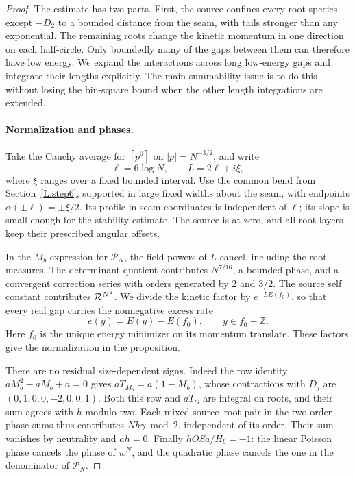 \begin{proof}
The estimate has two parts. First, the source confines every root species
except \(-D_2\) to a bounded distance from the seam, with tails stronger
than any exponential. The remaining roots change the kinetic momentum
in one direction on each half-circle. Only boundedly many of the gaps
between them can therefore have low energy. We expand the interactions
across long low-energy gaps and integrate their lengths explicitly. The
main summability issue is to do this without losing the bin-square bound
when the other length integrations are extended.

\paragraph{Normalization and phases.}
Take the Cauchy average for \([p^0]\) on \(|p|=N^{-3/2}\), and write
\[
 \ell=6\log N,\qquad L=2\ell+i\xi,
\]
where \(\xi\) ranges over a fixed bounded interval. Use the common bend
from Section~\ref{L:step6}, supported in large fixed widths about the
seam, with endpoints \(\alpha(\pm\ell)=\pm\xi/2\). Its profile in seam
coordinates is independent of \(\ell\); its slope is small enough for
the stability estimate. The source is at zero, and all root layers keep
their prescribed angular offsets.

In the \(M_b\) expression for \(\mathscr P_N\), the field powers of
\(L\) cancel, including the root measures. The determinant quotient
contributes \(N^{7/16}\), a bounded phase, and a convergent correction
series with orders generated by \(2\) and \(3/2\). The source self
constant contributes \({\cal R}^{N^2}\). We divide the kinetic factor
by \(e^{-L E(f_0)}\), so that every real gap carries the nonnegative
excess rate
\[
 e(y)=E(y)-E(f_0),\qquad y\in f_0+\mathbb Z.
\]
Here \(f_0\) is the unique energy minimizer on its momentum translate.
These factors give the normalization in the proposition.

There are no residual size-dependent signs. Indeed the row identity
\(aM_b^2-aM_b+a=0\) gives
\(aT_{M_b}=a(1-M_b)\), whose contractions with \(D_j\) are
\((0,1,0,0,-2,0,0,1)\). Both this row and \(aT_O\) are integral on
roots, and their sum agrees with \(h\) modulo two. Each mixed
source--root pair in the two order-phase sums thus contributes
\(Nh\gamma\bmod2\), independent of its order. Their sum vanishes by
neutrality and \(ah=0\). Finally \(hOSa/H_b=-1\): the linear Poisson
phase cancels the phase of \(w^N\), and the quadratic phase cancels the
one in the denominator of \(\mathscr P_N\).


\end{proof}
